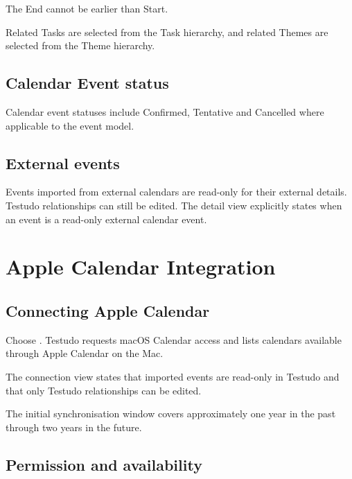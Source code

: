 \documentclass{testudomanual}
\begin{document}
The End cannot be earlier than Start.

Related Tasks are selected from the Task hierarchy, and related Themes are selected from the Theme hierarchy.

\section{Calendar Event status}

Calendar event statuses include Confirmed, Tentative and Cancelled where applicable to the event model.

\section{External events}

Events imported from external calendars are read-only for their external details. Testudo relationships can still be edited. The detail view explicitly states when an event is a read-only external calendar event.


\chapter{Apple Calendar Integration}

\section{Connecting Apple Calendar}

Choose . Testudo requests macOS Calendar access and lists calendars available through Apple Calendar on the Mac.

The connection view states that imported events are read-only in Testudo and that only Testudo relationships can be edited.

The initial synchronisation window covers approximately one year in the past through two years in the future.

\section{Permission and availability}
\end{document}
